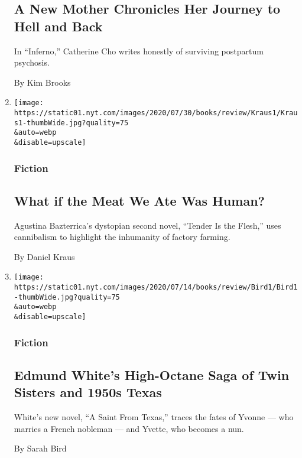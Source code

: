 \begin{enumerate}
  \hypertarget{a-new-mother-chronicles-her-journey-to-hell-and-back}{%
  \subsection{A New Mother Chronicles Her Journey to Hell and
  Back}\label{a-new-mother-chronicles-her-journey-to-hell-and-back}}

  In ``Inferno,'' Catherine Cho writes honestly of surviving postpartum
  psychosis.

  By Kim Brooks
\item
  \href{/2020/08/04/books/review/tender-is-the-flesh-agustina-bazterrica.html}{}

  \texttt{[image: https://static01.nyt.com/images/2020/07/30/books/review/Kraus1/Kraus1-thumbWide.jpg?quality=75\\\&auto=webp\\\&disable=upscale]}

  \hypertarget{fiction-2}{%
  \subsubsection{Fiction}\label{fiction-2}}

  \hypertarget{what-if-the-meat-we-ate-was-human}{%
  \subsection{What if the Meat We Ate Was
  Human?}\label{what-if-the-meat-we-ate-was-human}}

  Agustina Bazterrica's dystopian second novel, ``Tender Is the Flesh,''
  uses cannibalism to highlight the inhumanity of factory farming.

  By Daniel Kraus
\item
  \href{/2020/08/04/books/review/edmund-white-saint-from-texas.html}{}

  \texttt{[image: https://static01.nyt.com/images/2020/07/14/books/review/Bird1/Bird1-thumbWide.jpg?quality=75\\\&auto=webp\\\&disable=upscale]}

  \hypertarget{fiction-3}{%
  \subsubsection{Fiction}\label{fiction-3}}

  \hypertarget{edmund-whites-high-octane-saga-of-twin-sisters-and-1950s-texas}{%
  \subsection{Edmund White's High-Octane Saga of Twin Sisters and 1950s
  Texas}\label{edmund-whites-high-octane-saga-of-twin-sisters-and-1950s-texas}}

  White's new novel, ``A Saint From Texas,'' traces the fates of Yvonne
  --- who marries a French nobleman --- and Yvette, who becomes a nun.

  By Sarah Bird
\end{enumerate}


